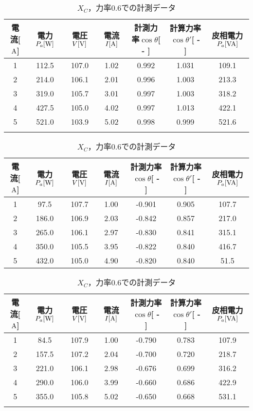 \begin{table}[h]
\centering
	\caption{$X_{C}$，力率$1.0$での計測データ}
	\label{tab:1data2}
\begin{tabular}{ccccccc}
	\hline
	電流[$\rm{A}$] & 電力$P_a[\rm{W}]$ & 電圧$V[\rm{V}]$ & 電流$I[\rm{A}]$ & 計測力率$\cos \theta$[ - ] & 計算力率$\cos \theta '$[ - ] & 皮相電力$P_a[\rm{VA}]$ \\ \hline
	1 & 112.5 & 107.0 & 1.02 & 0.992 & 1.031 & 109.1 \\
	2 & 214.0 & 106.1 & 2.01 & 0.996 & 1.003 & 213.3 \\
	3 & 319.0 & 105.7 & 3.01 & 0.997 & 1.003 & 318.2 \\
	4 & 427.5 & 105.0 & 4.02 & 0.997 & 1.013 & 422.1 \\
	5 & 521.0 & 103.9 & 5.02 & 0.998 & 0.999 & 521.6 \\ \hline\\
\end{tabular}
	\caption{$X_{C}$，力率$0.8$での計測データ}
	\label{tab:0.8data2}
\begin{tabular}{ccccccc}
	\hline
	電流[$\rm{A}$] & 電力$P_a[\rm{W}]$ & 電圧$V[\rm{V}]$ & 電流$I[\rm{A}]$ & 計測力率$\cos \theta$[ - ] & 計算力率$\cos \theta '$[ - ] & 皮相電力$P_a[\rm{VA}]$ \\ \hline
	1 & 97.5  & 107.7 & 1.00 & -0.901 & 0.905 & 107.7 \\
	2 & 186.0 & 106.9 & 2.03 & -0.842 & 0.857 & 217.0 \\
	3 & 265.0 & 106.1 & 2.97 & -0.830 & 0.841 & 315.1 \\
	4 & 350.0 & 105.5 & 3.95 & -0.822 & 0.840 & 416.7 \\
	5 & 432.0 & 105.0 & 4.90 & -0.820 & 0.840 & 51.5  \\ \hline
\end{tabular}
	\caption{$X_{C}$，力率$0.6$での計測データ}
	\label{tab:0.6data2}
\begin{tabular}{ccccccc}
	\hline
	電流[$\rm{A}$] & 電力$P_a[\rm{W}]$ & 電圧$V[\rm{V}]$ & 電流$I[\rm{A}]$ & 計測力率$\cos \theta$[ - ] & 計算力率$\cos \theta '$[ - ] & 皮相電力$P_a[\rm{VA}]$ \\ \hline
	1 & 84.5  & 107.9 & 1.00 & -0.790 & 0.783 & 107.9 \\
	2 & 157.5 & 107.2 & 2.04 & -0.700 & 0.720 & 218.7 \\
	3 & 221.0 & 106.1 & 2.98 & -0.676 & 0.699 & 316.2 \\
	4 & 290.0 & 106.0 & 3.99 & -0.660 & 0.686 & 422.9 \\
	5 & 355.0 & 105.8 & 5.02 & -0.650 & 0.668 & 531.1 \\ \hline\\

\end{tabular}
\end{table}
